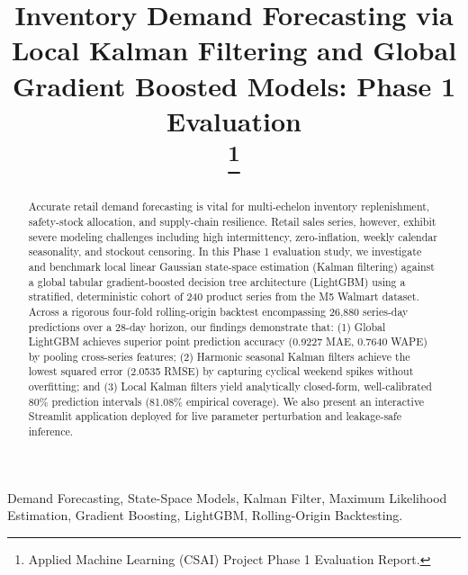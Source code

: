 \documentclass[conference]{IEEEtran}
\begin{document}
\title{Inventory Demand Forecasting via Local Kalman Filtering and Global Gradient Boosted Models: Phase 1 Evaluation\\
\thanks{Applied Machine Learning (CSAI) Project Phase 1 Evaluation Report.}
}

\author{
}

\maketitle

\begin{abstract}
Accurate retail demand forecasting is vital for multi-echelon inventory replenishment, safety-stock allocation, and supply-chain resilience. Retail sales series, however, exhibit severe modeling challenges including high intermittency, zero-inflation, weekly calendar seasonality, and stockout censoring. In this Phase 1 evaluation study, we investigate and benchmark local linear Gaussian state-space estimation (Kalman filtering) against a global tabular gradient-boosted decision tree architecture (LightGBM) using a stratified, deterministic cohort of 240 product series from the M5 Walmart dataset. Across a rigorous four-fold rolling-origin backtest encompassing 26,880 series-day predictions over a 28-day horizon, our findings demonstrate that: (1) Global LightGBM achieves superior point prediction accuracy (0.9227 MAE, 0.7640 WAPE) by pooling cross-series features; (2) Harmonic seasonal Kalman filters achieve the lowest squared error (2.0535 RMSE) by capturing cyclical weekend spikes without overfitting; and (3) Local Kalman filters yield analytically closed-form, well-calibrated 80\% prediction intervals (81.08\% empirical coverage). We also present an interactive Streamlit application deployed for live parameter perturbation and leakage-safe inference.
\end{abstract}

\begin{IEEEkeywords}
Demand Forecasting, State-Space Models, Kalman Filter, Maximum Likelihood Estimation, Gradient Boosting, LightGBM, Rolling-Origin Backtesting.
\end{IEEEkeywords}
\end{document}
